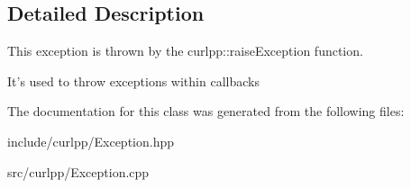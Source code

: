 \subsection{Detailed Description}
This exception is thrown by the curlpp\-::raise\-Exception function. 

It's used to throw exceptions within callbacks 

The documentation for this class was generated from the following files\-:\begin{DoxyCompactItemize}
\item 
include/curlpp/Exception.\-hpp\item 
src/curlpp/Exception.\-cpp\end{DoxyCompactItemize}
